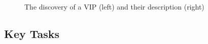 \documentclass[12pt]{scrartcl}
\begin{document}
		\begin{figure}[H]%
    			\centering
   			\qquad
    			\caption{The discovery of a VIP (left) and their description (right)}%
    			\label{discoveryDescription}%
		\end{figure}


	\subsection{Key Tasks}
	
\end{document}
